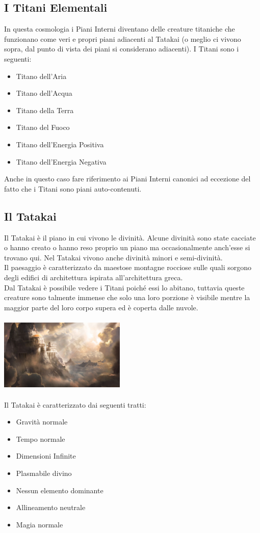 \documentclass[10pt, a4paper]{report}
\begin{document}
\begin{multicols}{2}
\subsection*{I Titani Elementali}
In questa cosmologia i Piani Interni diventano delle creature titaniche che funzionano come veri e propri piani adiacenti al Tatakai (o meglio ci vivono sopra, dal punto di vista dei piani si considerano adiacenti). I Titani sono i seguenti:
\begin{itemize}
\item Titano dell'Aria
\item Titano dell'Acqua
\item Titano della Terra
\item Titano del Fuoco
\item Titano dell'Energia Positiva
\item Titano dell'Energia Negativa
\end{itemize}
Anche in questo caso fare riferimento ai Piani Interni canonici ad eccezione del fatto che i Titani sono piani auto-contenuti.
\subsection*{Il Tatakai}
Il Tatakai è il piano in cui vivono le divinità. Alcune divinità sono state cacciate o hanno creato o hanno reso proprio un piano ma occasionalmente anch'esse si trovano qui. Nel Tatakai vivono anche divinità minori e semi-divinità.\\
Il paesaggio è caratterizzato da maestose montagne rocciose sulle quali sorgono degli edifici di architettura ispirata all'architettura greca.\\
Dal Tatakai è possibile vedere i Titani poiché essi lo abitano, tuttavia queste creature sono talmente immense che solo una loro porzione è visibile mentre la maggior parte del loro corpo supera ed è coperta dalle nuvole.\\
\\
\includegraphics[width = 6cm]{tatakai.png}\\
\\
Il Tatakai è caratterizzato dai seguenti tratti:
\begin{itemize}
	\item Gravità normale
	\item Tempo normale
	\item Dimensioni Infinite
	\item Plasmabile divino
	\item Nessun elemento dominante
	\item Allineamento neutrale
	\item Magia normale
\end{itemize}


\end{multicols}
\end{document}
